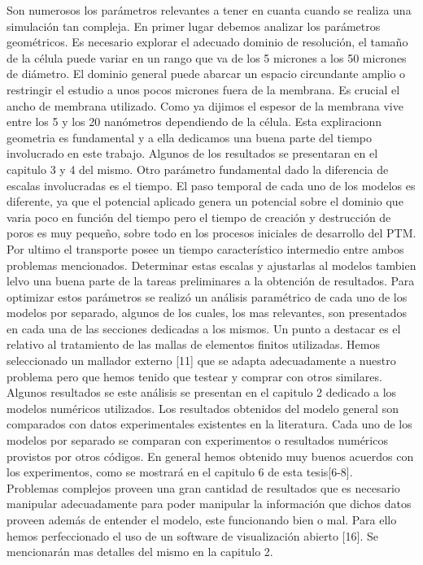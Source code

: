 Son numerosos los parámetros relevantes a tener en cuanta cuando se realiza una simulación tan compleja. En primer lugar debemos analizar los parámetros geométricos. Es necesario explorar el adecuado dominio de resolución, el tamaño de la célula puede variar en un rango que va de los 5 micrones a los 50 micrones de diámetro. El dominio general puede abarcar un espacio circundante amplio o restringir el estudio a unos pocos micrones fuera de la membrana. Es crucial el ancho de membrana utilizado. Como ya dijimos el espesor de la membrana vive entre los 5 y los 20 nanómetros dependiendo de la célula. Esta expliracionn geometria es fundamental y a ella dedicamos una buena parte del tiempo involucrado en este trabajo. 
Algunos de los resultados se presentaran en el capitulo 3 y 4 del mismo. Otro parámetro fundamental dado la diferencia de escalas involucradas es el tiempo. El paso temporal de cada uno de los modelos es diferente, ya que el potencial aplicado genera un potencial sobre el dominio que varia poco en función del tiempo pero el tiempo de creación y destrucción de poros es muy pequeño, sobre todo en los procesos iniciales de desarrollo del PTM. Por ultimo el transporte posee un tiempo característico intermedio entre ambos problemas mencionados. Determinar estas escalas y ajustarlas al modelos tambien lelvo una buena parte de la tareas preliminares a la obtención de resultados.
Para optimizar estos parámetros se realizó un análisis paramétrico de cada uno de los modelos por separado, algunos de los cuales, los mas relevantes, son presentados en cada una de las secciones dedicadas a los mismos. 
Un punto a destacar es el relativo al tratamiento de las mallas de elementos finitos utilizadas. Hemos seleccionado un mallador externo [11] que se adapta adecuadamente a nuestro problema pero que hemos tenido que testear y comprar con otros similares. Algunos resultados se este análisis se presentan en el capitulo 2 dedicado a los modelos numéricos utilizados.
Los resultados obtenidos del modelo general son comparados con datos experimentales existentes en la literatura. Cada uno de los modelos por separado se comparan con experimentos o resultados numéricos provistos por otros códigos. En general hemos obtenido muy buenos acuerdos con los experimentos, como se mostrará en el capitulo 6 de esta tesis[6-8].\\

 Problemas complejos proveen una gran cantidad de resultados que es necesario manipular adecuadamente para poder manipular la información que dichos datos proveen además de entender el modelo, este funcionando bien o mal. Para ello hemos perfeccionado el uso de un software de visualización abierto [16]. Se mencionarán mas detalles del mismo en la capitulo 2.
